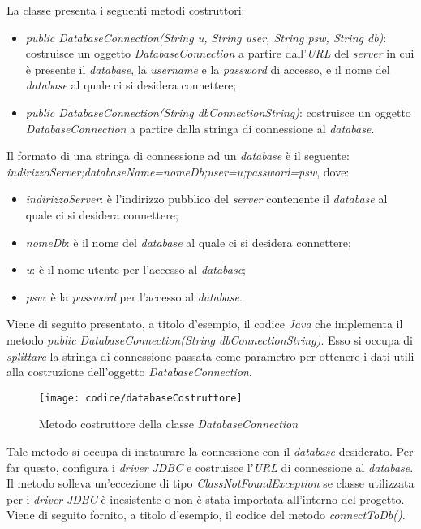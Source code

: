 La classe presenta i seguenti metodi costruttori:
\begin{itemize}
	\item \textit{public DatabaseConnection(String u, String user, String psw, String db)}: costruisce un oggetto \textit{DatabaseConnection} a partire dall'\textit{URL} del \textit{server} in cui è presente il \textit{database}, la \textit{username} e la \textit{password} di accesso, e il nome del \textit{database} al quale ci si desidera connettere;
	\item \textit{public DatabaseConnection(String dbConnectionString)}: costruisce un oggetto \textit{DatabaseConnection} a partire dalla stringa di connessione al \textit{database}.
\end{itemize}
Il formato di una stringa di connessione ad un \textit{database} è il seguente: \textit{indirizzoServer;databaseName=nomeDb;user=u;password=psw}, dove:
\begin{itemize}
	\item \textit{indirizzoServer}: è l'indirizzo pubblico del \textit{server} contenente il \textit{database} al quale ci si desidera connettere;
	\item \textit{nomeDb}: è il nome del \textit{database} al quale ci si desidera connettere;
	\item \textit{u}: è il nome utente per l'accesso al \textit{database};
	\item \textit{psw}: è la \textit{password} per l'accesso al \textit{database}.
\end{itemize}
Viene di seguito presentato, a titolo d'esempio, il codice \textit{Java} che implementa il metodo \textit{public DatabaseConnection(String dbConnectionString)}. Esso si occupa di \textit{splittare} la stringa di connessione passata come parametro per ottenere i dati utili alla costruzione dell'oggetto \textit{DatabaseConnection}.
\newpage
\begin{figure}[!h] 
    \centering 
    \texttt{[image: codice/databaseCostruttore]} 
    \caption{Metodo costruttore della classe \textit{DatabaseConnection}}
\end{figure}


Tale metodo si occupa di instaurare la connessione con il \textit{database} desiderato. Per far questo, configura i \textit{driver} \textit{JDBC} e costruisce l'\textit{URL} di connessione al \textit{database}. Il metodo solleva un'eccezione di tipo \textit{ClassNotFoundException} se classe utilizzata per i \textit{driver} \textit{JDBC} è inesistente o non è stata importata all'interno del progetto. Viene di seguito fornito, a titolo d'esempio, il codice del metodo \textit{connectToDb()}.


